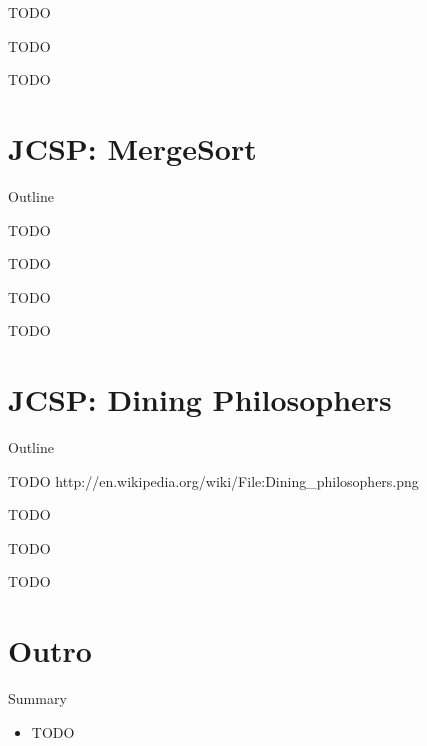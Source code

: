 \begin{frame}{TODO}
  
\end{frame}

\begin{frame}{TODO}
  
\end{frame}

\begin{frame}{TODO}
  
\end{frame}


\section{JCSP: MergeSort}

\begin{frame}{Outline}
  \tableofcontents[current]
\end{frame}

\begin{frame}{TODO}

\end{frame}

\begin{frame}{TODO}

\end{frame}

\begin{frame}{TODO}

\end{frame}

\begin{frame}{TODO}

\end{frame}

\section{JCSP: Dining Philosophers}

\begin{frame}{Outline}
  \tableofcontents[current]
\end{frame}

\begin{frame}{TODO}
http://en.wikipedia.org/wiki/File:Dining_philosophers.png
\end{frame}

\begin{frame}{TODO}

\end{frame}

\begin{frame}{TODO}

\end{frame}

\begin{frame}{TODO}

\end{frame}


\section*{Outro}

\begin{frame}{Summary}
  \begin{itemize}
  \item TODO
\end{itemize}
\end{frame}


